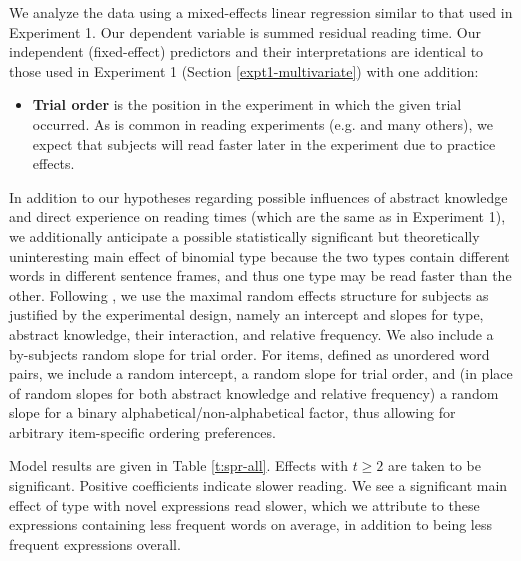 \documentclass[authoryear]{elsarticle}
\begin{document}
We analyze the data using a mixed-effects linear regression similar to that used in Experiment 1. Our dependent variable is summed residual reading time. Our independent (fixed-effect) predictors and their interpretations are identical to those used in Experiment 1 (Section \ref{expt1-multivariate}) with one addition:
%
\begin{itemize}
  \item \textbf{Trial order} is the position in the experiment in which the given trial occurred. As is common in reading experiments (e.g. \citealp{Hofmeister:2011vg,Fine:2013vt} and many others), we expect that subjects will read faster later in the experiment due to practice effects.
\end{itemize}
%
In addition to our hypotheses regarding possible influences of abstract knowledge and direct experience on reading times (which are the same as in Experiment 1), we additionally anticipate a possible statistically significant but theoretically uninteresting main effect of binomial type because the two types contain different words in different sentence frames, and thus one type may be read faster than the other. Following \citet{Barr:2013vf}, we use the maximal random effects structure for subjects as justified by the experimental design, namely an intercept and slopes for type, abstract knowledge, their interaction, and relative frequency. We also include a by-subjects random slope for trial order. For items, defined as unordered word pairs, we include a random intercept, a random slope for trial order, and (in place of random slopes for both abstract knowledge and relative frequency) a random slope for a binary alphabetical/non-alphabetical factor, thus allowing for arbitrary item-specific ordering preferences.


Model results are given in Table \ref{t:spr-all}.\footnotemark{} Effects with $t\ge 2$ are taken to be significant. Positive coefficients indicate slower reading. We see a significant main effect of type with novel expressions read slower, which we attribute to these expressions containing less frequent words on average, in addition to being less frequent expressions overall.

\end{document}
